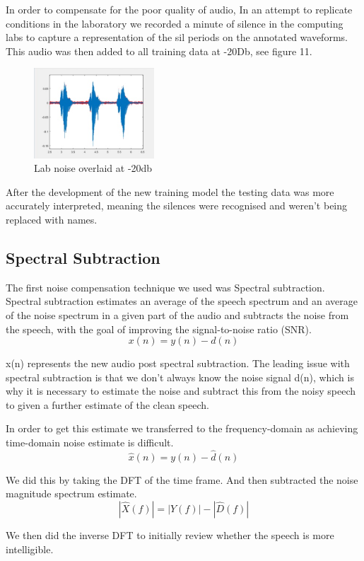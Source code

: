 \documentclass[	DIV=calc,%
							paper=a4,%
							fontsize=9.8pt,%
							twocolumn]{scrartcl}	 					%
\begin{document}
In order to compensate for the poor quality of audio, In an attempt to replicate conditions in the laboratory we recorded a minute of silence in the computing labs to capture a representation of the sil periods on the annotated waveforms. This audio was then added to all training data at -20Db, see figure 11. 
\begin{figure}[ht]
	\centering
	\includegraphics[width=0.4\textwidth]{noise}
	\captionsetup{justification=centering}
	\caption{Lab noise overlaid at -20db}
\end{figure}

After the development of the new training model the testing data was more accurately interpreted, meaning the silences were recognised and weren’t being replaced  with names.

\subsection{Spectral Subtraction}
The first noise compensation technique we used was Spectral subtraction. Spectral subtraction estimates an average of the speech spectrum and an average of  the noise spectrum in a given part of the audio and subtracts the noise from the speech, with the goal of improving the signal-to-noise ratio (SNR). 
\[x(n) = y(n) - d(n)\]

x(n) represents the new audio post spectral subtraction. 
The leading issue with spectral subtraction is that we don’t always know the noise signal d(n), which is why it is necessary to estimate the noise and subtract this from the noisy speech to given a further estimate of the clean speech.

In order to get this estimate we transferred to the frequency-domain as achieving time-domain noise estimate is difficult.
\[\hat{x}(n)=y(n)-\hat{d}(n)\]

We did this by taking the DFT of the time frame. And then subtracted the noise magnitude spectrum estimate. 
\[\left | \hat{X}(f) \right |=\left | Y(f) \right |- \left | \hat{D}(f) \right|\]

We then did the inverse DFT to initially review whether the speech is more intelligible.
\end{document}
